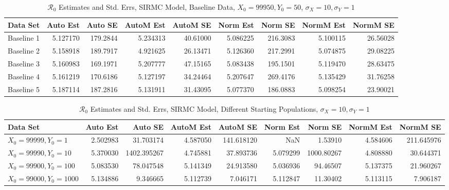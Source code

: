 \documentclass[12pt]{article}
\newcommand{\rr}{\ensuremath{\mathcal{R}_0}}
\begin{document}
\begin{table}[H]
	
	\caption{$\rr$ Estimates and Std. Errs, SIRMC Model,
		Baseline Data, $X_0 = 99950, Y_0 = 50$, 
		$\sigma_X = 10, \sigma_Y = 1$}
	\begin{footnotesize}
		\hskip -1cm
		\begin{tabular}{l|r|r|r|r|r|r|r|r}
			\hline
			Data Set & Auto Est & Auto SE & AutoM Est & AutoM SE & Norm Est & Norm SE & NormM Est & NormM SE\\
			\hline
			Baseline 1 & 5.127170 & 179.2844 & 5.234313 & 40.61000 & 5.086225 & 216.3083 & 5.100115 & 26.56028\\
			\hline
			Baseline 2 & 5.158918 & 189.7917 & 4.921625 & 26.13471 & 5.126360 & 217.2991 & 5.074875 & 29.08225\\
			\hline
			Baseline 3 & 5.160983 & 169.1971 & 5.207777 & 47.15165 & 5.083438 & 195.1501 & 5.119470 & 28.63475\\
			\hline
			Baseline 4 & 5.161219 & 170.6186 & 5.127197 & 34.24464 & 5.207647 & 269.4176 & 5.135429 & 31.76258\\
			\hline
			Baseline 5 & 5.187114 & 187.2816 & 5.131911 & 31.43095 & 5.077370 & 186.0883 & 5.098254 & 23.90021\\
			\hline
		\end{tabular}
	\end{footnotesize}
\end{table}

\begin{table}[H]
	
	\caption{$\rr$ Estimates and Std. Errs, SIRMC Model,
		Different Starting Populations, 
		$\sigma_X = 10, \sigma_Y = 1$}
	\begin{footnotesize}
		\hskip -1.7cm
		\begin{tabular}{l|r|r|r|r|r|r|r|r}
			\hline
			Data Set & Auto Est & Auto SE & AutoM Est & AutoM SE & Norm Est & Norm SE & NormM Est & NormM SE\\
			\hline
			$X_0 = 99999, Y_0 = 1$ & 2.502983 & 31.703174 & 4.587050 & 141.618120 & NaN & 1.53910 & 4.584606 & 211.645976\\
			\hline
			$X_0 = 99990, Y_0 = 10$ & 5.370030 & 1402.395267 & 4.745881 & 37.893736 & 5.079299 & 1000.80267 & 4.808880 & 30.644371\\
			\hline
			$X_0 = 99900, Y_0 = 100$ & 5.083530 & 78.047548 & 5.141349 & 24.913580 & 5.036936 & 94.46507 & 5.137375 & 21.960267\\
			\hline
			$X_0 = 99000, Y_0 = 1000$ & 5.134886 & 9.346665 & 5.112739 & 7.046171 & 5.112847 & 11.30402 & 5.113115 & 7.906187\\
			\hline
		\end{tabular}
	\end{footnotesize}
\end{table}
\end{document}
